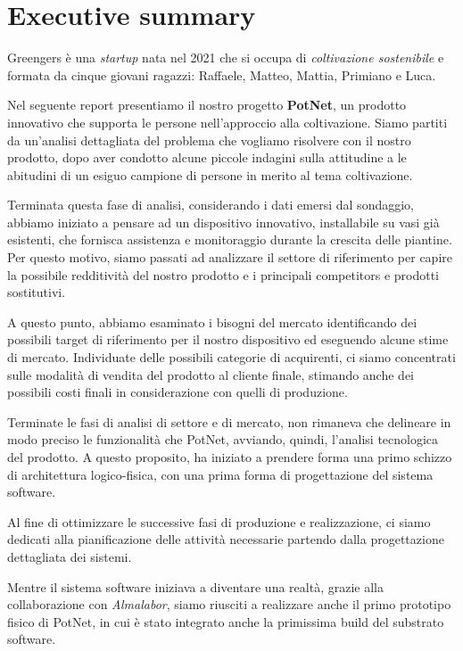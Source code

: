 \section{Executive summary}

Greengers è una \textit{startup} nata nel 2021 che si occupa di \textit{coltivazione sostenibile} e formata da cinque giovani ragazzi: Raffaele, Matteo, Mattia, Primiano e Luca.

Nel seguente report presentiamo il nostro progetto \textbf{PotNet}, un prodotto innovativo che supporta le persone nell'approccio alla coltivazione.
Siamo partiti da un'analisi dettagliata del problema che vogliamo risolvere con il nostro prodotto, dopo aver condotto alcune piccole indagini sulla attitudine a le abitudini di un esiguo campione di persone in merito al tema coltivazione.

Terminata questa fase di analisi, considerando i dati emersi dal sondaggio, abbiamo iniziato a pensare ad un dispositivo innovativo, installabile su vasi già esistenti, che fornisca assistenza e monitoraggio durante la crescita delle piantine.
Per questo motivo, siamo passati ad analizzare il settore di riferimento per capire la possibile redditività del nostro prodotto e i principali competitors e prodotti sostitutivi.

A questo punto, abbiamo esaminato i bisogni del mercato identificando dei possibili target di riferimento per il nostro dispositivo ed eseguendo alcune stime di mercato.
Individuate delle possibili categorie di acquirenti, ci siamo concentrati sulle modalità di vendita del prodotto al cliente finale, stimando anche dei possibili costi finali in considerazione con quelli di produzione.

Terminate le fasi di analisi di settore e di mercato, non rimaneva che delineare in modo preciso le funzionalità che PotNet, avviando, quindi, l'analisi tecnologica del prodotto. A questo proposito, ha iniziato a prendere forma una primo schizzo di architettura logico-fisica, con una prima forma di progettazione del sistema software.

Al fine di ottimizzare le successive fasi di produzione e realizzazione, ci siamo dedicati alla pianificazione delle attività necessarie partendo dalla progettazione dettagliata dei sistemi.

Mentre il sistema software iniziava a diventare una realtà, grazie alla collaborazione con \textit{Almalabor}, siamo riusciti a realizzare anche il primo prototipo fisico di PotNet, in cui è stato integrato anche la primissima build del substrato software.

